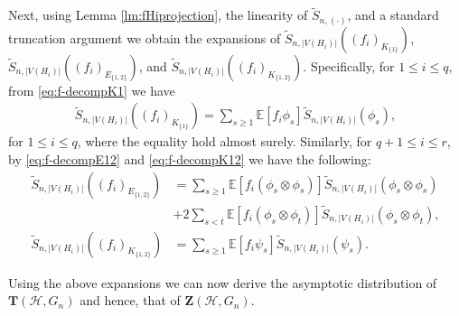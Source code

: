\documentclass[11pt,reqno]{amsart}
\numberwithin{equation}{section}
\theoremstyle{definition}
\begin{document}
Next, using Lemma \ref{lm:fHiprojection}, the linearity of $\tilde{S}_{n,(\cdot)}$, and a standard truncation argument we obtain the expansions of $\tilde{S}_{n,|V(H_i)|}((f_{i})_{K_{\{1\}}})$, $\tilde{S}_{n,|V(H_i)|}((f_{i})_{E_{\{1,2\}}})$, and $\tilde{S}_{n,|V(H_i)|}((f_{i})_{K_{\{1,2\}}})$. Specifically, for $1\leq i\leq q$, from \eqref{eq:f-decompK1}  we have 
\begin{align}\label{eq:sum-exchange-3}
    \tilde{S}_{n,|V(H_i)|}((f_{i})_{K_{\{1\}}}) = \sum_{s \geq 1}\mathbb{E}\left[f_{i}\phi_{s}\right]\tilde{S}_{n,|V(H_i)|}\left(\phi_{s}\right),
\end{align}
for $1\leq i\leq q$, where the equality hold almost surely.
Similarly, for $q+1 \leq i \leq r$, by \eqref{eq:f-decompE12} and \eqref{eq:f-decompK12} we have the following: 
\begin{align}
    \tilde{S}_{n,|V(H_i)|}((f_{i})_{E_{\{1,2\}}}) 
    & = \sum_{s \geq 1}\mathbb{E}\left[f_{i}(\phi_{s}\otimes\phi_{s})\right]\tilde{S}_{n,|V(H_i)|}\left(\phi_{s}\otimes\phi_{s}\right)\nonumber\\
    & + 2\sum_{s < t}\mathbb{E}\left[f_{i}(\phi_{s}\otimes\phi_{t})\right]\tilde{S}_{n,|V(H_i)|}\left(\phi_{s}\otimes\phi_{t}\right), \label{eq:sum-exchange-2}\\ 
    \tilde{S}_{n,|V(H_i)|}((f_{i})_{K_{\{1,2\}}}) & = \sum_{s \geq 1}\mathbb{E}\left[f_{i}\psi_{s}\right]\tilde{S}_{n,|V(H_i)|}(\psi_{s}). \label{eq:sum-exchange-1}
\end{align} 



Using the above expansions we can now derive the asymptotic distribution of $ \bm T(\mathcal H, G_n)$ and hence, that of $\bm Z(\mathcal H, G_n)$. 
\end{document}

